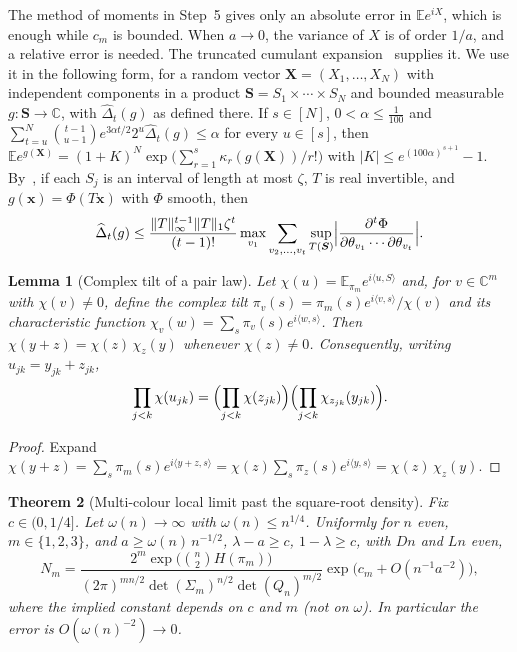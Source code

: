 \documentclass[11pt]{article}
\newtheorem{theorem}{Theorem}
\newtheorem{lemma}[theorem]{Lemma}
\newcommand{\EE}{\mathbb{E}}
\begin{document}
The method of moments in Step~5 gives only an absolute error in
\(\EE e^{iX}\), which is enough while \(c_m\) is bounded. When \(a\to0\), the
variance of \(X\) is of order \(1/a\), and a relative error is needed. The
truncated cumulant expansion~\cite[Theorem~2.6]{IM25} supplies it.
We use it in the following form, for a random vector
\(\boldsymbol X=(X_1,\ldots,X_N)\) with independent components in a product
\(\boldsymbol S=S_1\times\cdots\times S_N\) and bounded measurable
\(g:\boldsymbol S\to\mathbb C\), with \(\widehat\Delta_t(g)\) as defined there.
If \(s\in[N]\), \(0<\alpha\le\frac1{100}\) and
\(\sum_{t=u}^N\binom{t-1}{u-1}e^{3\alpha t/2}2^u\widehat\Delta_t(g)\le\alpha\) for
every \(u\in[s]\), then
\(\EE e^{g(\boldsymbol X)}=(1+K)^N\exp\bigl(\sum_{r=1}^s\kappa_r(g(\boldsymbol X))/r!\bigr)\)
with \(|K|\le e^{(100\alpha)^{s+1}}-1\).
By~\cite[Lemma~2.7]{IM25}, if each \(S_j\) is an interval of length at most
\(\zeta\), \(T\) is real invertible, and \(g(\boldsymbol x)=\Phi(T\boldsymbol x)\)
with \(\Phi\) smooth, then
\[
\widehat\Delta_t(g)\le\frac{\|T\|_\infty^{t-1}\|T\|_1\zeta^t}{(t-1)!}
\max_{v_1}\sum_{v_2,\ldots,v_t}\sup_{T(\boldsymbol S)}
\Bigl|\frac{\partial^t\Phi}{\partial\theta_{v_1}\cdots\partial\theta_{v_t}}\Bigr|.
\]

\begin{lemma}[Complex tilt of a pair law]
\label{lem:mllt-tilt}
Let \(\chi(u)=\EE_{\pi_m}e^{i\langle u,S\rangle}\) and, for \(v\in\mathbb C^m\) with
\(\chi(v)\ne0\), define the complex tilt
\(\pi_v(s)=\pi_m(s)e^{i\langle v,s\rangle}/\chi(v)\) and its characteristic
function \(\chi_v(w)=\sum_s\pi_v(s)e^{i\langle w,s\rangle}\). Then
\(\chi(y+z)=\chi(z)\,\chi_z(y)\) whenever \(\chi(z)\ne0\).
Consequently, writing \(u_{jk}=y_{jk}+z_{jk}\),
\[
\prod_{j<k}\chi(u_{jk})
=\Bigl(\prod_{j<k}\chi(z_{jk})\Bigr)
\Bigl(\prod_{j<k}\chi_{z_{jk}}(y_{jk})\Bigr).
\]
\end{lemma}

\begin{proof}
Expand \(\chi(y+z)=\sum_s\pi_m(s)e^{i\langle y+z,s\rangle}
=\chi(z)\sum_s\pi_z(s)e^{i\langle y,s\rangle}=\chi(z)\,\chi_z(y)\).
\end{proof}

\begin{theorem}[Multi-colour local limit past the square-root density]
\label{thm:mllt-sparse}
Fix \(c\in(0,1/4]\). Let \(\omega(n)\to\infty\) with \(\omega(n)\le n^{1/4}\).
Uniformly for \(n\) even, \(m\in\{1,2,3\}\), and
\(a\ge\omega(n)\,n^{-1/2}\), \(\lambda-a\ge c\), \(1-\lambda\ge c\), with \(Dn\)
and \(Ln\) even,
\[
N_m=\frac{2^m\exp\bigl(\binom n2H(\pi_m)\bigr)}
{(2\pi)^{mn/2}\det(\Sigma_m)^{n/2}\det(Q_n)^{m/2}}
\exp\bigl(c_m+O(n^{-1}a^{-2})\bigr),
\]
where the implied constant depends on \(c\) and \(m\) (not on \(\omega\)).
In particular the error is \(O(\omega(n)^{-2})\to0\).
\end{theorem}
\end{document}
